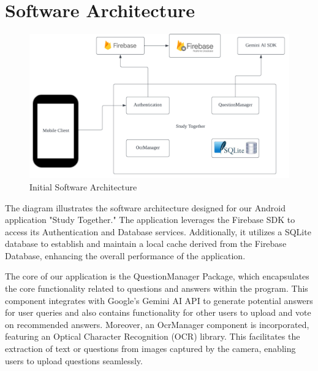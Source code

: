 \chapter{Software Architecture}\label{software_architecture}

\begin{figure}[h]
       \centering
       \includegraphics[scale = .80]{Figures/StudyTogether_Architecture.png}
       \caption{\footnotesize Initial Software Architecture}
       \label{StudyTogether_Architecture}
\end{figure}

The diagram illustrates the software architecture designed for our Android application "Study Together." The application leverages the Firebase SDK to access its Authentication and Database services. Additionally, it utilizes a SQLite database to establish and maintain a local cache derived from the Firebase Database, enhancing the overall performance of the application.

The core of our application is the QuestionManager Package, which encapsulates the core functionality related to questions and answers within the program. This component integrates with Google's Gemini AI API to generate potential answers for user queries and also contains functionality for other users to upload and vote on recommended answers. Moreover, an OcrManager component is incorporated, featuring an Optical Character Recognition (OCR) library. This facilitates the extraction of text or questions from images captured by the camera, enabling users to upload questions seamlessly.
